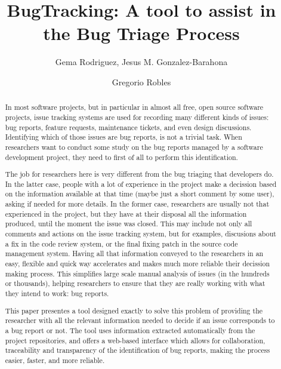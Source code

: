 \documentclass[ifip]{svmult}
\begin{document}
\title*{BugTracking: A tool to assist in the Bug Triage Process}
\author{Gema Rodriguez, Jesus M. Gonzalez-Barahona \and Gregorio Robles}
%
%
\maketitle

\begin{abstract}
	In most software projects, but in particular in almost all free, open source software projects, issue tracking systems are used for recording many different kinds of issues: bug reports, feature requests, maintenance tickets, and even design discussions. Identifying which of those issues are bug reports, is not a trivial task. When researchers want to conduct some study on the bug reports managed by a software development project, they need to first of all to perform this identification.

	The job for researchers here is very different from the bug triaging that developers do. In the latter case, people with a lot of experience in the project make a decission based on the information available at that time (maybe just a short comment by some user), asking if needed for more details. In the former case, researchers are usually not that experienced in the project, but they have at their disposal all the information produced, until the moment the issue was closed. This may include not only all comments and actions on the issue tracking system, but for examples, discusions about a fix in the code review system, or the final fixing patch in the source code management system. Having all that information conveyed to the researchers in an easy, flexible and quick way accelerates and makes much more reliable their decission making process. This simplifies large scale manual analysis of issues (in the hundreds or thousands), helping researchers to ensure that they are really working with what they intend to work: bug reports.

	This paper presentes a tool designed exactly to solve this problem of providing the researcher with all the relevant information needed to decide if an issue corresponds to a bug report or not. The tool uses information extracted automatically from the project repositories, and offers a web-based interface which allows for collaboration, traceability and transparency of the identification of bug reports, making the process easier, faster, and more reliable.
\end{abstract}
\end{document}
